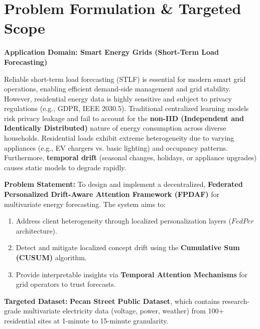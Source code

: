 \documentclass[11pt, a4paper]{article}
\begin{document}
\vspace{0.3cm}


\section{Problem Formulation \& Targeted Scope}

\textbf{Application Domain: Smart Energy Grids (Short-Term Load Forecasting)}

Reliable short-term load forecasting (STLF) is essential for modern smart grid operations, enabling efficient demand-side management and grid stability. However, residential energy data is highly sensitive and subject to privacy regulations (e.g., GDPR, IEEE 2030.5). Traditional centralized learning models risk privacy leakage and fail to account for the \textbf{non-IID (Independent and Identically Distributed)} nature of energy consumption across diverse households. Residential loads exhibit extreme heterogeneity due to varying appliances (e.g., EV chargers vs. basic lighting) and occupancy patterns. Furthermore, \textbf{temporal drift} (seasonal changes, holidays, or appliance upgrades) causes static models to degrade rapidly.

\textbf{Problem Statement:}
To design and implement a decentralized, \textbf{Federated Personalized Drift-Aware Attention Framework (FPDAF)} for multivariate energy forecasting. The system aims to:
\begin{enumerate}[noitemsep, leftmargin=1.5em]
\item Address client heterogeneity through localized personalization layers ($FedPer$ architecture).
\item Detect and mitigate localized concept drift using the \textbf{Cumulative Sum (CUSUM)} algorithm.
\item Provide interpretable insights via \textbf{Temporal Attention Mechanisms} for grid operators to trust forecasts.
\end{enumerate}

\textbf{Targeted Dataset:} \textbf{Pecan Street Public Dataset}, which contains research-grade multivariate electricity data (voltage, power, weather) from 100+ residential sites at 1-minute to 15-minute granularity.

\end{document}
